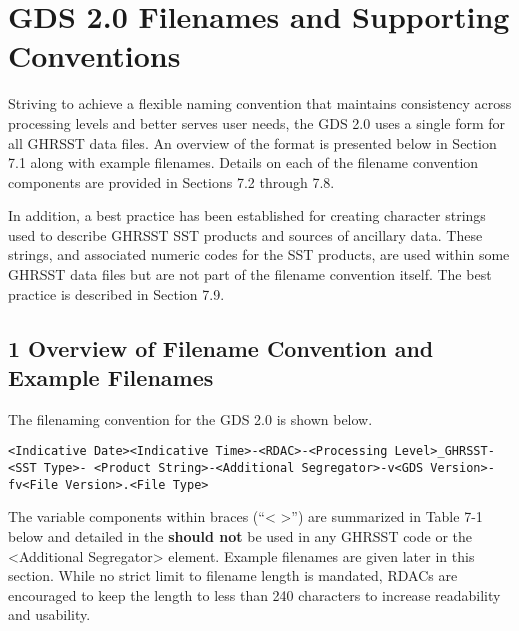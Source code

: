 \pagebreak
\section{GDS 2.0 Filenames and Supporting Conventions}

Striving to achieve a flexible naming convention that maintains consistency across processing levels
and better serves user needs, the GDS 2.0 uses a single form for all GHRSST data files. An overview
of the format is presented below in Section 7.1 along with example filenames. Details on each of the
filename convention components are provided in Sections 7.2 through 7.8.
\par
In addition, a best practice has been established for creating character strings used to describe
GHRSST SST products and sources of ancillary data. These strings, and associated numeric codes
for the SST products, are used within some GHRSST data files but are not part of the filename
convention itself. The best practice is described in Section 7.9.
\par

\subsection{1 Overview of Filename Convention and Example Filenames}
The filenaming convention for the GDS 2.0 is shown below. 
\par \vspace{0.25in}

\texttt{<Indicative Date><Indicative Time>-<RDAC>-<Processing Level>\_GHRSST-<SST Type>-
<Product String>-<Additional Segregator>-v<GDS Version>-fv<File Version>.<File Type>}
\par \vspace{0.25in}

The variable components within braces (“< >”) are summarized in Table 7-1 below and detailed in the
\textbf{should not} be used in any GHRSST code or the <Additional Segregator> element. Example
filenames are given later in this section. While no strict limit to filename length is mandated, RDACs
are encouraged to keep the length to less than 240 characters to increase readability and usability.

